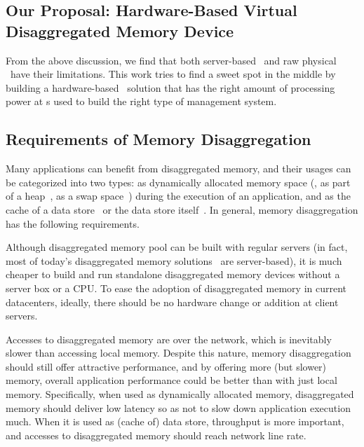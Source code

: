 \subsection{Our Proposal: Hardware-Based Virtual Disaggregated Memory Device}

From the above discussion, we find that both server-based \md\ and raw physical \md\ have their limitations.
This work tries to find a sweet spot in the middle by building a hardware-based \md\ solution that has the right amount of processing power at \MN{}s
used to build the right type of \MN{} management system.
\fi




\subsection{Requirements of Memory Disaggregation}
Many applications can benefit from disaggregated memory, and their usages can be categorized into two types:
as dynamically allocated memory space (\eg, as part of a heap~\cite{Semeru}, as a swap space~\cite{InfiniSwap}) during the execution of an application,
and as the cache of a data store~\cite{XXX} or the data store itself~\cite{RAMCloud}.
In general, memory disaggregation has the following requirements.

Although disaggregated memory pool can be built with regular servers 
(in fact, most of today's disaggregated memory solutions~\cite{AIFM,FarMem,InfiniSwap,Semeru} are server-based),
it is much cheaper to build and run standalone disaggregated memory devices without a server box or a CPU.
To ease the adoption of disaggregated memory in current datacenters, ideally, there should be no hardware change or addition at client servers.

Accesses to disaggregated memory are over the network, which is inevitably slower than accessing local memory.
Despite this nature, memory disaggregation should still offer attractive performance, and by offering more (but slower) memory,
overall application performance could be better than with just local memory.
Specifically, when used as dynamically allocated memory, disaggregated memory should deliver low latency so as not to slow down application execution much.
When it is used as (cache of) data store, throughput is more important, 
and accesses to disaggregated memory should reach network line rate.

